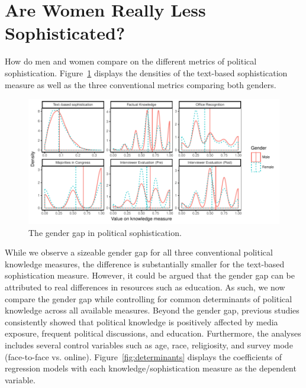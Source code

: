 \documentclass[12pt]{article}
\begin{document}
\section*{Are Women Really Less Sophisticated?}

How do men and women compare on the different metrics of political sophistication. Figure~\ref{fig:densities} displays the densities of the text-based sophistication measure as well as the three conventional metrics comparing both genders.

\begin{figure}[h]\centering
\includegraphics{../fig/densities.pdf}
\caption{The gender gap in political sophistication.}\label{fig:densities}
\end{figure}

While we observe a sizeable gender gap for all three conventional political knowledge measures, the difference is substantially smaller for the text-based sophistication measure. However, it could be argued that the gender gap can be attributed to real differences in resources such as education. As such, we now compare the gender gap while controlling for common determinants of political knowledge across all available measures. Beyond the gender gap, previous studies consistently showed that political knowledge is positively affected by media exposure, frequent political discussions, and education. Furthermore, the analyses includes several control variables such as age, race, religiosity, and survey mode (face-to-face vs. online). Figure~\ref{fig:determinants} displays the coefficients of regression models with each knowledge/sophistication measure as the dependent variable.
\end{document}

